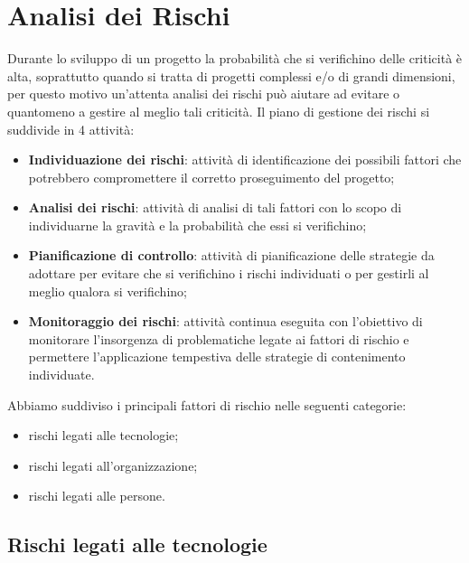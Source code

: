 \section{Analisi dei Rischi}
Durante lo sviluppo di un progetto la probabilità che si verifichino delle criticità è alta, 
soprattutto quando si tratta di progetti complessi e/o di grandi dimensioni, per questo motivo
un'attenta analisi dei rischi può aiutare ad evitare o quantomeno a gestire al meglio tali criticità.
Il piano di gestione dei rischi si suddivide in 4 attività:
\begin{itemize}
    \item \textbf{Individuazione dei rischi}: attività di identificazione dei possibili fattori che potrebbero compromettere il corretto proseguimento del progetto;
    \item \textbf{Analisi dei rischi}: attività di analisi di tali fattori con lo scopo di individuarne la gravità e la probabilità che essi si verifichino;
    \item \textbf{Pianificazione di controllo}: attività di pianificazione delle strategie da adottare per evitare che si verifichino i rischi individuati o per gestirli al meglio qualora si verifichino;
    \item \textbf{Monitoraggio dei rischi}: attività continua eseguita con l'obiettivo di monitorare l'insorgenza di problematiche legate ai fattori di rischio e permettere l'applicazione tempestiva delle strategie di contenimento individuate.
\end{itemize}
Abbiamo suddiviso i principali fattori di rischio nelle seguenti categorie:
\begin{itemize}
    \item rischi legati alle tecnologie;
    \item rischi legati all’organizzazione;
    \item rischi legati alle persone.
\end{itemize}

\subsection{Rischi legati alle tecnologie}

